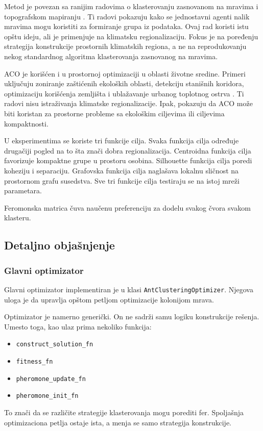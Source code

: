 \documentclass[11pt]{article}
\begin{document}
Metod je povezan sa ranijim radovima o klasterovanju zasnovanom na mravima i topografskom mapiranju \cite{deneubourg1991,handl2006}. Ti radovi pokazuju kako se jednostavni agenti nalik mravima mogu koristiti za formiranje grupa iz podataka. Ovaj rad koristi istu opštu ideju, ali je primenjuje na klimatsku regionalizaciju. Fokus je na poređenju strategija konstrukcije prostornih klimatskih regiona, a ne na reprodukovanju nekog standardnog algoritma klasterovanja zasnovanog na mravima.

ACO je korišćen i u prostornoj optimizaciji u oblasti životne sredine. Primeri uključuju zoniranje zaštićenih ekoloških oblasti, detekciju stanišnih koridora, optimizaciju korišćenja zemljišta i ublažavanje urbanog toplotnog ostrva \cite{liu2012,peng2019,zhang2021,tong2024}. Ti radovi nisu istraživanja klimatske regionalizacije. Ipak, pokazuju da ACO može biti koristan za prostorne probleme sa ekološkim ciljevima ili ciljevima kompaktnosti.

U eksperimentima se koriste tri funkcije cilja. Svaka funkcija cilja određuje drugačiji pogled na to šta znači dobra regionalizacija. Centroidna funkcija cilja favorizuje kompaktne grupe u prostoru osobina. Silhouette funkcija cilja poredi koheziju i separaciju. Grafovska funkcija cilja naglašava lokalnu sličnost na prostornom grafu susedstva. Sve tri funkcije cilja testiraju se na istoj mreži parametara.

Feromonska matrica čuva naučenu preferenciju za dodelu svakog čvora svakom klasteru.

\subsection{Detaljno objašnjenje}

\subsubsection{Glavni optimizator}
Glavni optimizator implementiran je u klasi \texttt{AntClusteringOptimizer}. Njegova uloga je da upravlja opštom petljom optimizacije kolonijom mrava.

Optimizator je namerno generički. On ne sadrži samu logiku konstrukcije rešenja. Umesto toga, kao ulaz prima nekoliko funkcija:
\begin{itemize}
  \item \texttt{construct\_solution\_fn}
  \item \texttt{fitness\_fn}
  \item \texttt{pheromone\_update\_fn}
  \item \texttt{pheromone\_init\_fn}
\end{itemize}
To znači da se različite strategije klasterovanja mogu porediti fer. Spoljašnja optimizaciona petlja ostaje ista, a menja se samo strategija konstrukcije.
\end{document}
